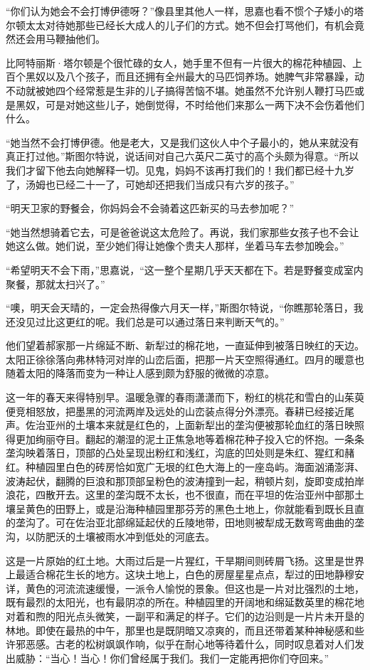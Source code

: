\par “你们认为她会不会打博伊德呀？”像县里其他人一样，思嘉也看不惯个子矮小的塔尔顿太太对待她那些已经长大成人的儿子们的方式。她不但会打骂他们，有机会竟然还会用马鞭抽他们。
\par 比阿特丽斯·塔尔顿是个很忙碌的女人，她手里不但有一片很大的棉花种植园、上百个黑奴以及八个孩子，而且还拥有全州最大的马匹饲养场。她脾气非常暴躁，动不动就被她四个经常惹是生非的儿子搞得苦恼不堪。她虽然不允许别人鞭打马匹或是黑奴，可是对她这些儿子，她倒觉得，不时给他们来那么一两下决不会伤着他们什么。
\par “她当然不会打博伊德。他是老大，又是我们这伙人中个子最小的，她从来就没有真正打过他。”斯图尔特说，说话间对自己六英尺二英寸的高个头颇为得意。“所以我们才留下他去向她解释一切。见鬼，妈妈不该再打我们的！我们都已经十九岁了，汤姆也已经二十一了，可她却还把我们当成只有六岁的孩子。”
\par “明天卫家的野餐会，你妈妈会不会骑着这匹新买的马去参加呢？”
\par “她当然想骑着它去，可是爸爸说这太危险了。再说，我们家那些女孩子也不会让她这么做。她们说，至少她们得让她像个贵夫人那样，坐着马车去参加晚会。”
\par “希望明天不会下雨，”思嘉说，“这一整个星期几乎天天都在下。若是野餐变成室内聚餐，那就太扫兴了。”
\par “噢，明天会天晴的，一定会热得像六月天一样，”斯图尔特说，“你瞧那轮落日，我还没见过比这更红的呢。我们总是可以通过落日来判断天气的。”
\par 他们望着郝家那一片绵延不断、新犁过的棉花地，一直延伸到被落日映红的天边。太阳正徐徐落向弗林特河对岸的山峦后面，把那一片天空照得通红。四月的暖意也随着太阳的降落而变为一种让人感到颇为舒服的微微的凉意。
\par 这一年的春天来得特别早。温暖急骤的春雨潇潇而下，粉红的桃花和雪白的山茱萸便竞相怒放，把墨黑的河流两岸及远处的山峦装点得分外漂亮。春耕已经接近尾声。佐治亚州的土壤本来就是红色的，上面新犁出的垄沟便被那轮血红的落日映照得更加绚丽夺目。翻起的潮湿的泥土正焦急地等着棉花种子投入它的怀抱。一条条垄沟映着落日，顶部的凸处呈现出粉红和浅红，沟底的凹处则是朱红、猩红和赭红。种植园里白色的砖房恰如宽广无垠的红色大海上的一座岛屿。海面汹涌澎湃、波涛起伏，翻腾的巨浪和那顶部呈粉色的波涛撞到一起，稍顿片刻，旋即变成拍岸浪花，四散开去。这里的垄沟既不太长，也不很直，而在平坦的佐治亚州中部那土壤呈黄色的田野上，或是沿海种植园里那芬芳的黑色土地上，你就能看到既长且直的垄沟了。可在佐治亚北部绵延起伏的丘陵地带，田地则被犁成无数弯弯曲曲的垄沟，以防肥沃的土壤被雨水冲到低处的河底去。
\par 这是一片原始的红土地。大雨过后是一片猩红，干旱期间则砖屑飞扬。这里是世界上最适合棉花生长的地方。这块土地上，白色的房屋星星点点，犁过的田地静穆安详，黄色的河流流速缓慢，一派令人愉悦的景象。但这也是一片对比强烈的土地，既有最烈的太阳光，也有最阴凉的所在。种植园里的开阔地和绵延数英里的棉花地对着和煦的阳光点头微笑，一副平和满足的样子。它们的边沿则是一片片未开垦的林地。即使在最热的中午，那里也是既阴暗又凉爽的，而且还带着某种神秘感和些许邪恶感。古老的松树飒飒作响，似乎在耐心地等待着什么，同时叹息着对人们发出威胁：“当心！当心！你们曾经属于我们。我们一定能再把你们夺回来。”
